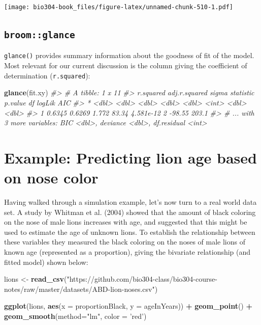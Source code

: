 \documentclass[]{book}
\newenvironment{Shaded}{\begin{snugshade}}{\end{snugshade}}
\newcommand{\CommentTok}[1]{\textcolor[rgb]{0.56,0.35,0.01}{\textit{#1}}}
\newcommand{\DataTypeTok}[1]{\textcolor[rgb]{0.13,0.29,0.53}{#1}}
\newcommand{\KeywordTok}[1]{\textcolor[rgb]{0.13,0.29,0.53}{\textbf{#1}}}
\newcommand{\NormalTok}[1]{#1}
\newcommand{\OperatorTok}[1]{\textcolor[rgb]{0.81,0.36,0.00}{\textbf{#1}}}
\newcommand{\StringTok}[1]{\textcolor[rgb]{0.31,0.60,0.02}{#1}}
\theoremstyle{definition}
\theoremstyle{definition}
\theoremstyle{definition}
\theoremstyle{remark}
\begin{document}
\texttt{[image: bio304-book\_files/figure-latex/unnamed-chunk-510-1.pdf]}

\hypertarget{broomglance}{%
\subsection{\texorpdfstring{\texttt{broom::glance}}{broom::glance}}\label{broomglance}}

\texttt{glance()} provides summary information about the goodness of fit
of the model. Most relevant for our current discussion is the column
giving the coefficient of determination (\texttt{r.squared}):

\begin{Shaded}
\begin{Highlighting}[]
\KeywordTok{glance}\NormalTok{(fit.xy)}
\CommentTok{#> # A tibble: 1 x 11}
\CommentTok{#>   r.squared adj.r.squared sigma statistic   p.value    df logLik   AIC}
\CommentTok{#> *     <dbl>         <dbl> <dbl>     <dbl>     <dbl> <int>  <dbl> <dbl>}
\CommentTok{#> 1    0.6345        0.6269 1.772     83.34 4.581e-12     2 -98.55 203.1}
\CommentTok{#> # ... with 3 more variables: BIC <dbl>, deviance <dbl>, df.residual <int>}
\end{Highlighting}
\end{Shaded}

\hypertarget{example-predicting-lion-age-based-on-nose-color}{%
\section{Example: Predicting lion age based on nose
color}\label{example-predicting-lion-age-based-on-nose-color}}

Having walked through a simulation example, let's now turn to a real
world data set. A study by Whitman et al. (2004) showed that the amount
of black coloring on the nose of male lions increases with age, and
suggested that this might be used to estimate the age of unknown lions.
To establish the relationship between these variables they measured the
black coloring on the noses of male lions of known age (represented as a
proportion), giving the bivariate relationship (and fitted model) shown
below:

\begin{Shaded}
\begin{Highlighting}[]
\NormalTok{lions <-}\StringTok{ }\KeywordTok{read_csv}\NormalTok{(}\StringTok{"https://github.com/bio304-class/bio304-course-notes/raw/master/datasets/ABD-lion-noses.csv"}\NormalTok{)}

\KeywordTok{ggplot}\NormalTok{(lions, }\KeywordTok{aes}\NormalTok{(}\DataTypeTok{x =}\NormalTok{ proportionBlack, }\DataTypeTok{y =}\NormalTok{ ageInYears)) }\OperatorTok{+}\StringTok{ }
\StringTok{  }\KeywordTok{geom_point}\NormalTok{() }\OperatorTok{+}
\StringTok{  }\KeywordTok{geom_smooth}\NormalTok{(}\DataTypeTok{method=}\StringTok{"lm"}\NormalTok{, }\DataTypeTok{color =} \StringTok{'red'}\NormalTok{)}
\end{Highlighting}
\end{Shaded}
\end{document}
